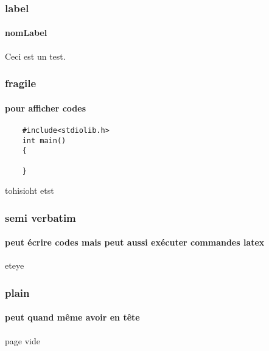 \documentclass{beamer}
\begin{document}
	
	\begin{frame}[label=nomLabel]
	\frametitle{label}
	\framesubtitle{nomLabel}
	Ceci est un test.
	\end{frame}
	
	\begin{frame}[fragile]
	\frametitle{fragile}
	\framesubtitle{pour afficher codes}
	\begin{verbatim}
	#include<stdiolib.h>
	int main()
	{
		
	}
	\end{verbatim}
	\begin{center}
	tohisioht etst
	\end{center}
	\end{frame}
	
	\begin{frame}
	\frametitle{semi verbatim}
	\framesubtitle{peut écrire codes mais peut aussi exécuter commandes latex}
	\begin{semiverbatim}
	eteye
	\end{semiverbatim}
	\end{frame}
	
	\begin{frame}[plain]
	\frametitle{plain}
	\framesubtitle{peut quand même avoir en tête}
	page vide
	\end{frame}
	
\end{document}
